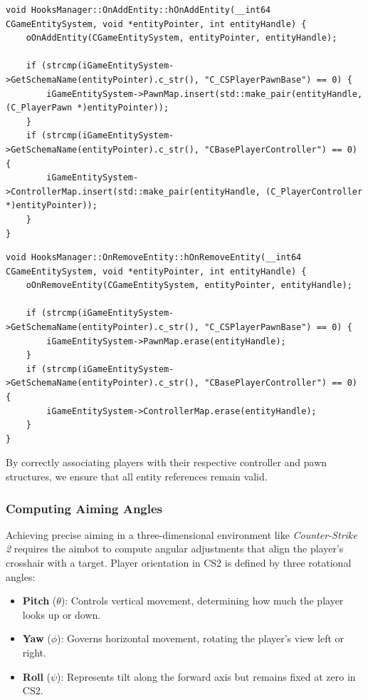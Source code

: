 \begin{lstlisting}[style=cppstyle, caption={OnAddEntity Hook}]
void HooksManager::OnAddEntity::hOnAddEntity(__int64 CGameEntitySystem, void *entityPointer, int entityHandle) {
    oOnAddEntity(CGameEntitySystem, entityPointer, entityHandle);

    if (strcmp(iGameEntitySystem->GetSchemaName(entityPointer).c_str(), "C_CSPlayerPawnBase") == 0) {
        iGameEntitySystem->PawnMap.insert(std::make_pair(entityHandle, (C_PlayerPawn *)entityPointer));
    }
    if (strcmp(iGameEntitySystem->GetSchemaName(entityPointer).c_str(), "CBasePlayerController") == 0) {
        iGameEntitySystem->ControllerMap.insert(std::make_pair(entityHandle, (C_PlayerController *)entityPointer));
    }
}
\end{lstlisting}

\begin{lstlisting}[style=cppstyle, caption={OnRemoveEntity Hook}]
void HooksManager::OnRemoveEntity::hOnRemoveEntity(__int64 CGameEntitySystem, void *entityPointer, int entityHandle) {
    oOnRemoveEntity(CGameEntitySystem, entityPointer, entityHandle);

    if (strcmp(iGameEntitySystem->GetSchemaName(entityPointer).c_str(), "C_CSPlayerPawnBase") == 0) {
        iGameEntitySystem->PawnMap.erase(entityHandle);
    }
    if (strcmp(iGameEntitySystem->GetSchemaName(entityPointer).c_str(), "CBasePlayerController") == 0) {
        iGameEntitySystem->ControllerMap.erase(entityHandle);
    }
}
\end{lstlisting}


By correctly associating players with their respective controller and pawn structures, we ensure that all entity references remain valid.


\subsubsection{Computing Aiming Angles}

Achieving precise aiming in a three-dimensional environment like \textit{Counter-Strike 2} requires the aimbot to compute angular adjustments that align the player's crosshair with a target. Player orientation in CS2 is defined by three rotational angles:

\begin{itemize}
    \item \textbf{Pitch} (\(\theta\)): Controls vertical movement, determining how much the player looks up or down.
    \item \textbf{Yaw} (\(\phi\)): Governs horizontal movement, rotating the player's view left or right.
    \item \textbf{Roll} (\(\psi\)): Represents tilt along the forward axis but remains fixed at zero in CS2.
\end{itemize}

